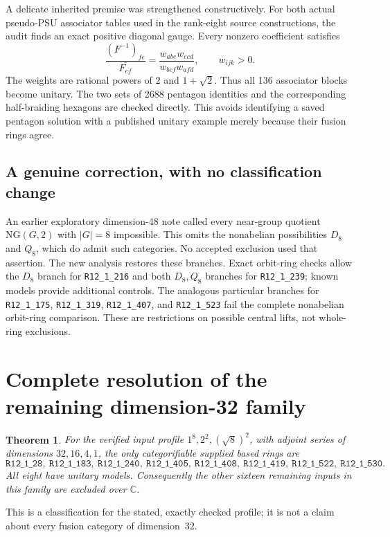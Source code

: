 \documentclass[11pt]{article}
\newtheorem{theorem}{Theorem}
\newcommand{\R}[1]{\texttt{R12\_1\_#1}}
\newcommand{\C}{\mathbb C}
\begin{document}
A delicate inherited premise was strengthened constructively. For both
actual pseudo-PSU associator tables used in the rank-eight source
constructions, the audit finds an exact positive diagonal gauge. Every
nonzero coefficient satisfies
\[
 \frac{(F^{-1})_{fe}}{\overline{F_{ef}}}
 =\frac{w_{abe}w_{ecd}}{w_{bcf}w_{afd}},\qquad w_{ijk}>0.
\]
The weights are rational powers of $2$ and $1+\sqrt2$. Thus all 136
associator blocks become unitary. The two sets of 2688 pentagon identities
and the corresponding half-braiding hexagons are checked directly.
This avoids identifying a saved pentagon solution with a published
unitary example merely because their fusion rings agree.

\subsection{A genuine correction, with no classification change}
An earlier exploratory dimension-48 note called every near-group quotient
$\mathrm{NG}(G,2)$ with $|G|=8$ impossible. This omits the nonabelian
possibilities $D_8$ and $Q_8$, which do admit such categories. No accepted
exclusion used that assertion. The new analysis restores these branches.
Exact orbit-ring checks allow the $D_8$ branch for \R{216} and both
$D_8,Q_8$ branches for \R{239}; known models provide additional controls.
The analogous particular branches for \R{175}, \R{319}, \R{407}, and
\R{523} fail the complete nonabelian orbit-ring comparison. These are
restrictions on possible central lifts, not whole-ring exclusions.

\section{Complete resolution of the remaining dimension-32 family}
\begin{theorem}
For the verified input profile
$1^8,2^2,(\sqrt8)^2$, with adjoint series of dimensions $32,16,4,1$,
the only categorifiable supplied based rings are
\[
 \R{28},\ \R{183},\ \R{240},\ \R{405},\
 \R{408},\ \R{419},\ \R{522},\ \R{530}.
\]
All eight have unitary models. Consequently the other sixteen remaining
inputs in this family are excluded over $\C$.
\end{theorem}
This is a classification for the stated, exactly checked profile; it is
not a claim about every fusion category of dimension~32.
\end{document}

